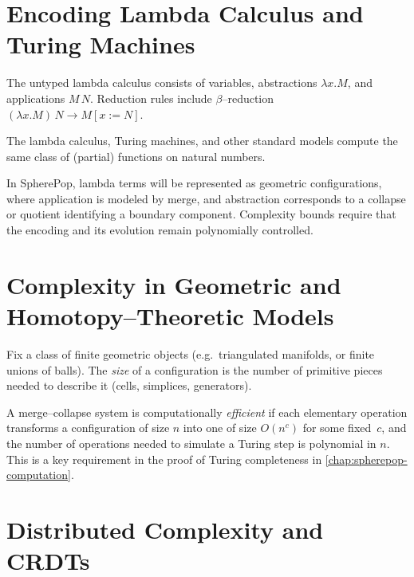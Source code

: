 \section{Encoding Lambda Calculus and Turing Machines}

\begin{definition}
The untyped lambda calculus consists of variables, abstractions $\lambda x.M$,
and applications $M\,N$.  Reduction rules include $\beta$--reduction
$(\lambda x.M)\,N \to M[x:=N]$.
\end{definition}

\begin{theorem}
The lambda calculus, Turing machines, and other standard models compute the
same class of (partial) functions on natural numbers.
\end{theorem}

\begin{remark}
In SpherePop, lambda terms will be represented as geometric configurations,
where application is modeled by merge, and abstraction corresponds to a
collapse or quotient identifying a boundary component.  Complexity bounds
require that the encoding and its evolution remain polynomially controlled.
\end{remark}

\section{Complexity in Geometric and Homotopy--Theoretic Models}

\begin{definition}
Fix a class of finite geometric objects (e.g.~triangulated manifolds, or
finite unions of balls).  The \emph{size} of a configuration is the number of
primitive pieces needed to describe it (cells, simplices, generators).
\end{definition}

\begin{remark}
A merge--collapse system is computationally \emph{efficient} if each elementary
operation transforms a configuration of size $n$ into one of size $O(n^c)$ for
some fixed~$c$, and the number of operations needed to simulate a Turing step
is polynomial in $n$.  This is a key requirement in the proof of Turing
completeness in \cref{chap:spherepop-computation}.
\end{remark}

\section{Distributed Complexity and CRDTs}

